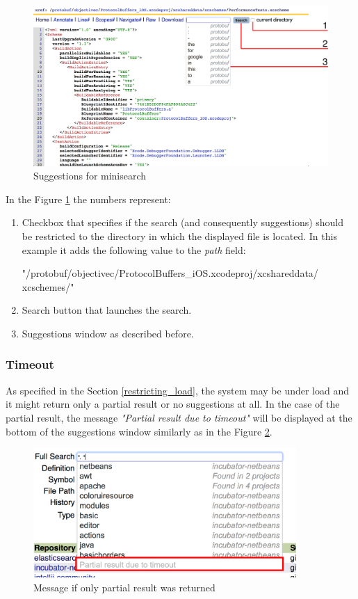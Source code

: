 \begin{figure}[htbp]
    \centering
    \includegraphics[width=145mm]{../img/minisearch.png}
    \caption{Suggestions for minisearch}
    \label{suggestions_minisearch}
\end{figure}

In the Figure \ref{suggestions_minisearch} the numbers represent:
\begin{enumerate}
    \item Checkbox that specifies if the search (and consequently suggestions) should be restricted to the directory
    in which the displayed file is located. In this example it adds the following value to the \textit{path} field:
\begin{code}
"/protobuf/objectivec/ProtocolBuffers_iOS.xcodeproj/xcshareddata/
xcschemes/"
\end{code}
    \item Search button that launches the search.
    \item Suggestions window as described before.
\end{enumerate}

\subsubsection{Timeout}
As specified in the Section \ref{restricting_load}, the system may be under load and it might return only a partial result or no
suggestions at all. In the case of the partial result, the message \textit{"Partial result due to timeout"} will be
displayed at the bottom of the suggestions window similarly as in the Figure \ref{partial_result}.
\begin{figure}[htbp]
    \centering
    \includegraphics[width=100mm]{../img/partial_result.png}
    \caption{Message if only partial result was returned}
    \label{partial_result}
\end{figure}

